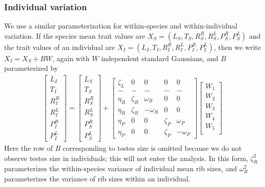 \documentclass[12pt]{article}
\begin{document}
%
\subsubsection*{Individual variation}

We use a similar parameterization for within-species and within-individual variation.
If the species mean trait values are $X_S = (L_S,T_S,R^R_S,R^L_S,P^R_S,P^L_S)$ 
and the trait values of an individual are $X_I = (L_I,T_I,R^R_I,R^L_I,P^R_I,P^L_I)$,
then we write $X_I = X_S + B W$, again with $W$ independent standard Gaussians,
and $B$ parameterized by
\begin{align} \label{eqn:sample_matrix}
\begin{bmatrix}
    L_I \\
    T_I \\
    R^R_I \\
    R^L_I \\
    P^R_I \\
    P^L_I
\end{bmatrix}
=
\begin{bmatrix}
    L_S \\
    T_S \\
    R^R_S \\
    R^L_S \\
    P^R_S \\
    P^L_S
\end{bmatrix}
+
\begin{bmatrix}
    \zeta_L  &   0 & 0  & 0  & 0 \\
    - & - & - & - & - \\
    \eta_R  & \zeta_R   &  \omega_R  & 0 & 0 \\ 
    \eta_R  & \zeta_R   & - \omega_R & 0 & 0\\ 
    \eta_P  & 0 & 0 &  \zeta_P  & \omega_P  \\ 
    \eta_P  & 0 & 0 &  \zeta_P  & - \omega_P
\end{bmatrix}
\begin{bmatrix}
W_1 \\W_2 \\W_3 \\W_4 \\ W_5  \\ 
\end{bmatrix}
\end{align}
Here the row of $B$ corresponding to testes size is omitted because we do not observe testes size in individuals;
this will not enter the analysis.
In this form, 
$\zeta_R^2$ parameterizes the within-species variance of individual mean rib sizes,
and $\omega_R^2$ parameterizes the variance of rib sizes within an individual.
\end{document}
